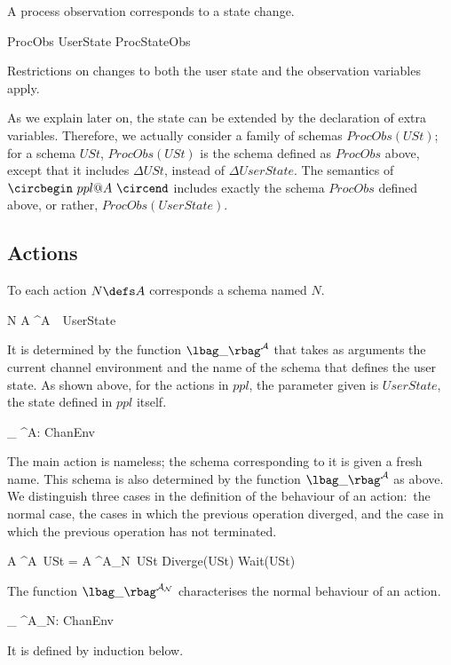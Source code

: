 \documentclass{article}
\begin{document}
A process observation corresponds to a state change.
\begin{zed}
  ProcObs  \Delta UserState \land ProcStateObs
\end{zed}
Restrictions on changes to both the user state and the observation
variables apply.

As we explain later on, the state can be extended by the declaration
of extra variables.  Therefore, we actually consider a family of
schemas $ProcObs(USt)$; for a schema $USt$, $ProcObs(USt)$ is the
schema defined as $ProcObs$ above, except that it includes
\mbox{$\Delta USt$}, instead of \mbox{$\Delta UserState$}.  The
semantics of \mbox{$\circbegin\ ppl @ A\ \circend$} includes exactly
the schema $ProcObs$ defined above, or rather, $ProcObs(UserState)$.

\subsection{Actions}

To each action \mbox{$N \defs A$} corresponds a schema named $N$.
\begin{zed}
  N  \lbag A \rbag^{\cal A}\ \gamma\ UserState\
\end{zed}
It is determined by the function \mbox{$\lbag\_ \rbag^{\cal A}$} that
takes as arguments the current channel environment and the name of the
schema that defines the user state.  As shown above, for the actions
in $ppl$, the parameter given is $UserState$, the state defined in
$ppl$ itself.
\begin{zed}
  \lbag\_ \rbag^{\cal A}:  \pfun ChanEnv \pfun
   \pfun {}
\end{zed}

The main action is nameless; the schema corresponding to it is given a
fresh name.  This schema is also determined by the function $\lbag\_
\rbag^{\cal A}$ as above.  We distinguish three cases in the
definition of the behaviour of an action:~the normal case, the cases
in which the previous operation diverged, and the case in which the
previous operation has not terminated.
\begin{zed}
  \lbag A \rbag^{\cal A}\gamma\ USt = \lbag A \rbag^{\cal A_N}\gamma\
  USt \lor Diverge(USt) \lor Wait(USt)
\end{zed}
The function \mbox{$\lbag\_ \rbag^{\cal A_N}$} characterises the
normal behaviour of an action.
\begin{zed}
  \lbag\_ \rbag^{\cal A_N}:  \pfun ChanEnv \pfun
  \mathsf{N} \pfun {}
\end{zed}
It is defined by induction below.
\end{document}
